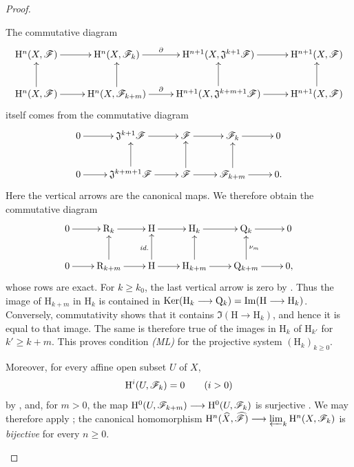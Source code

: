 \begin{proof}
\begin{env}[4.1.7.21]
\label{III.4.1.7.21}
The commutative diagram
\[
  \xymatrix@C=2.5em{
    \HH^n(X,\sh{F})
      \ar[r]
    &
    \HH^n(X,\sh{F}_k)
      \ar[r]^-{\partial}
    &
    \HH^{n+1}(X,\mathfrak{J}^{k+1}\sh{F})
      \ar[r]
    &
    \HH^{n+1}(X,\sh{F})
    \\
    \HH^n(X,\sh{F})
      \ar[r]\ar[u]
    &
    \HH^n(X,\sh{F}_{k+m})
      \ar[r]^-{\partial}\ar[u]
    &
    \HH^{n+1}(X,\mathfrak{J}^{k+m+1}\sh{F})
      \ar[r]\ar[u]
    &
    \HH^{n+1}(X,\sh{F})
      \ar[u]
  }
\]
itself comes from the commutative diagram
\[
  \xymatrix{
    0\ar[r]
    &
    \mathfrak{J}^{k+1}\sh{F}\ar[r]
    &
    \sh{F}\ar[r]
    &
    \sh{F}_k\ar[r]
    &
    0
    \\
    0\ar[r]
    &
    \mathfrak{J}^{k+m+1}\sh{F}\ar[r]\ar[u]
    &
    \sh{F}\ar[r]\ar[u]
    &
    \sh{F}_{k+m}\ar[r]\ar[u]
    &
    0.
  }
\]
Here the vertical arrows are the canonical maps.
We therefore obtain the commutative diagram
\[
  \xymatrix@C=2.2em{
    0\ar[r]
    &
    \mathrm{R}_k\ar[r]
    &
    \mathrm{H}\ar[r]
    &
    \mathrm{H}_k\ar[r]
    &
    \mathrm{Q}_k\ar[r]
    &
    0
    \\
    0\ar[r]
    &
    \mathrm{R}_{k+m}\ar[r]\ar[u]
    &
    \mathrm{H}\ar[r]\ar[u]^{\textit{id.}}
    &
    \mathrm{H}_{k+m}\ar[r]\ar[u]
    &
    \mathrm{Q}_{k+m}\ar[r]\ar[u]_{\nu_m}
    &
    0,
  }
\]
whose rows are exact.
For $k\geq k_0$, the last vertical arrow is zero by
.
Thus the image of $\mathrm{H}_{k+m}$ in $\mathrm{H}_k$ is contained
in $\operatorname{Ker}(\mathrm{H}_k\longrightarrow\mathrm{Q}_k)
=
\operatorname{Im}(\mathrm{H}\longrightarrow\mathrm{H}_k)$.
Conversely, commutativity shows that it contains
$\Im(\mathrm{H}\to\mathrm{H}_k)$, and hence it is equal to that
image.
The same is therefore true of the images in $\mathrm{H}_k$ of
$\mathrm{H}_{k'}$ for $k'\geq k+m$.
This proves condition \emph{(ML)} for the projective system
$(\mathrm{H}_k)_{k\geq0}$.

Moreover, for every affine open subset $U$ of $X$,
\[
  \mathrm{H}^i(U,\mathscr{F}_k)=0
  \qquad(i>0)
\]
by , and, for $m>0$, the map $\mathrm{H}^0(U,\mathscr{F}_{k+m})
\longrightarrow
\mathrm{H}^0(U,\mathscr{F}_k)$
is surjective .
We may therefore
apply ; the canonical homomorphism $\mathrm{H}^n(\widehat{X},\widehat{\mathscr{F}})
\longrightarrow
\varprojlim_k\mathrm{H}^n(X,\mathscr{F}_k)$
is \emph{bijective} for every $n\geq0$.


\end{env}
\end{proof}
